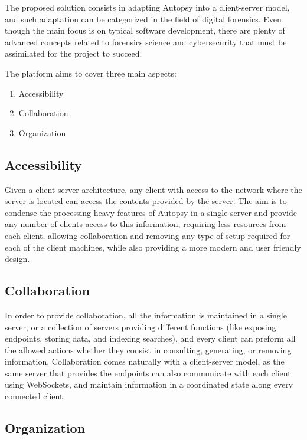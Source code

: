 The proposed solution consists in adapting Autopsy into a client-server model, and such adaptation can be categorized in the field of digital forensics. 
Even though the main focus is on typical software development, there are plenty of advanced concepts related to forensics science and cybersecurity 
that must be assimilated for the project to succeed.

The platform aims to cover three main aspects:
\begin{enumerate}
 \item Accessibility
 \item Collaboration
 \item Organization 
\end{enumerate}

\subsection{Accessibility}

Given a client-server architecture, any client with access to the network where the server is located can access the contents provided by the server.
The aim is to condense the processing heavy features of Autopsy in a single server and provide any number of clients access to this information, requiring less 
resources from each client, allowing collaboration and removing any type of setup required for each of the client machines, while also providing a more modern 
and user friendly design.

\subsection{Collaboration}

In order to provide collaboration, all the information is maintained in a single server, or a collection of servers providing different functions (like exposing endpoints,
storing data, and indexing searches), and every client can preform all the allowed actions whether they consist in consulting, generating, or removing information. 
Collaboration comes naturally with a client-server model, as the same server that provides the endpoints can also communicate with each client using WebSockets, and maintain 
information in a coordinated state along every connected client.

\subsection{Organization}

